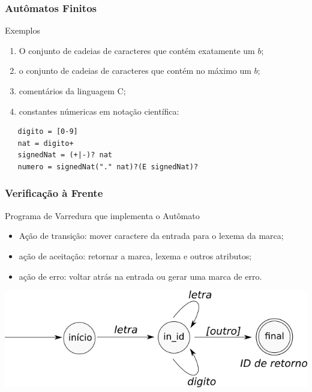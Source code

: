 \documentclass[table]{beamer}
\begin{document}
\begin{frame}[fragile]
   \frametitle{Autômatos Finitos}
   \begin{block}{Exemplos}
      \begin{enumerate}
         \item O conjunto de cadeias de caracteres que contém exatamente um $b$;
	 \item o conjunto de cadeias de caracteres que contém no máximo um $b$;
	 \item comentários da linguagem C;
	 \item constantes númericas em notação científica: 
      \end{enumerate}
   \end{block}
   \begin{verbatim}
   digito = [0-9]
   nat = digito+
   signedNat = (+|-)? nat
   numero = signedNat("." nat)?(E signedNat)?
   \end{verbatim}
\end{frame}

\begin{frame}
   \frametitle{Verificação à Frente}
   \begin{block}{Programa de Varredura que implementa o Autômato}
      \begin{itemize}
         \item Ação de transição: mover caractere da entrada para o lexema da marca;
	 \item ação de aceitação: retornar a marca, lexema e outros atributos;
	 \item ação de erro: voltar atrás na entrada ou gerar uma marca de erro.
      \end{itemize}
   \end{block}
   \includegraphics[width=\linewidth,height=\textheight,keepaspectratio]{figuras/automatodelimitador.png}
\end{frame}
\end{document}
